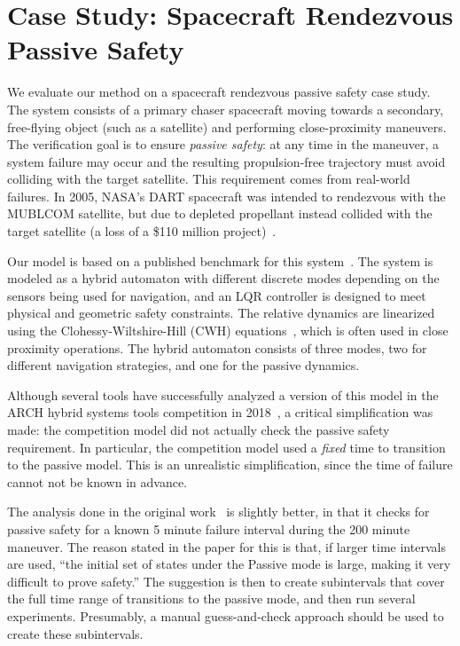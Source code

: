 \section{Case Study: Spacecraft Rendezvous Passive Safety}
\label{sec:casestudy}

We evaluate our method on a spacecraft rendezvous passive safety case study. The system consists of a primary chaser spacecraft moving towards a secondary, free-flying object (such as a satellite) and performing close-proximity maneuvers. The verification goal is to ensure \emph{passive safety}: at any time in the maneuver, a system failure may occur and the resulting propulsion-free trajectory must avoid colliding with the target satellite. This requirement comes from real-world failures. In 2005, NASA’s DART spacecraft was intended to rendezvous with the MUBLCOM satellite, but due to depleted propellant instead collided with the target satellite (a loss of a
\$110 million project)~\cite{croomes2006overview}.

Our model is based on a published benchmark for this system~\cite{chan2017verifying,jewison2016spacecraft}. The system is modeled as a hybrid automaton with different discrete modes depending on the sensors being used for navigation, and an LQR controller is designed to meet physical and geometric safety constraints. The relative dynamics are linearized using the Clohessy-Wiltshire-Hill (CWH) equations~\cite{wh1960terminal}, which is often used in close proximity operations. The hybrid automaton consists of three modes, two for different navigation strategies, and one for the passive dynamics.

Although several tools have successfully analyzed a version of this model in the ARCH hybrid systems tools competition in 2018~\cite{archcomp18linear}, a critical simplification was made: the competition model did not actually check the passive safety requirement. In particular, the competition model used a \emph{fixed} time to transition to the passive model. This is an unrealistic simplification, since the time of failure cannot not be known in advance. 

The analysis done in the original work~\cite{chan2017verifying} is slightly better, in that it checks for passive safety for a known 5 minute failure interval during the 200 minute maneuver. The reason stated in the paper for this is that, if larger time intervals are used, “the initial set of states under the Passive mode is large, making it very difficult to prove safety.” The suggestion is then to create subintervals that cover the full time range of transitions to the passive mode, and then run several experiments. Presumably, a manual guess-and-check approach should be used to create these subintervals.

